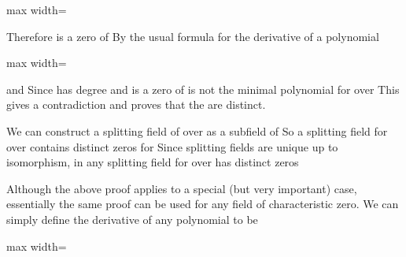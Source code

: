 \documentclass[11pt,oneside]{article}
\begin{document}
\begin{BookBody}
\begin{center}\begin{adjustbox}{max width=\linewidth}\end{adjustbox}\end{center}

Therefore  is a zero of  By the usual formula for the derivative of a polynomial

\begin{center}\begin{adjustbox}{max width=\linewidth}\end{adjustbox}\end{center}

\noindent and  Since  has degree  and  is a zero of  is not the minimal polynomial for  over  This gives a contradiction and proves that the  are distinct.

We can construct a splitting field of  over  as a subfield of  So a splitting field for  over  contains  distinct zeros for  Since splitting fields are unique up to isomorphism, in any splitting field for  over  has  distinct zeros\BookEnd{\blacklozenge}

Although the above proof applies to a special (but very important) case, essentially the same proof can be used for any field of characteristic zero. We can simply define the derivative of any polynomial  to be

\begin{center}\begin{adjustbox}{max width=\linewidth}\end{adjustbox}\end{center}

\end{BookBody}
\end{document}
